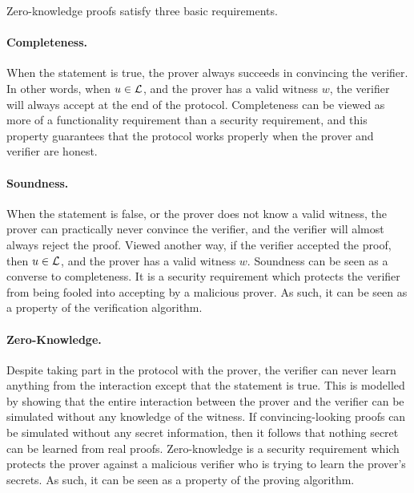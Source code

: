Zero-knowledge proofs satisfy three basic requirements.

\paragraph{Completeness.} When the statement is true, the prover always succeeds in convincing the verifier. In other words, when $u \in \mathcal{L}$, and the prover has a valid witness $w$, the verifier will always accept at the end of the protocol. Completeness can be viewed as more of a functionality requirement than a security requirement, and this property guarantees that the protocol works properly when the prover and verifier are honest.

\paragraph{Soundness.} When the statement is false, or the prover does not know a valid witness, the prover can practically never convince the verifier, and the verifier will almost always reject the proof. Viewed another way, if the verifier accepted the proof, then $u \in \mathcal{L}$, and the prover has a valid witness $w$. Soundness can be seen as a converse to completeness. It is a security requirement which protects the verifier from being fooled into accepting by a malicious prover. As such, it can be seen as a property of the verification algorithm.

\paragraph{Zero-Knowledge.} Despite taking part in the protocol with the prover, the verifier can never learn anything from the interaction except that the statement is true. This is modelled by showing that the entire interaction between the prover and the verifier can be simulated without any knowledge of the witness. If convincing-looking proofs can be simulated without any secret information, then it follows that nothing secret can be learned from real proofs. Zero-knowledge is a security requirement which protects the prover against a malicious verifier who is trying to learn the prover's secrets. As such, it can be seen as a property of the proving algorithm.

%

